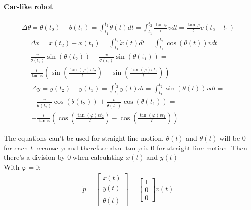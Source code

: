 \documentclass{article}
\begin{document}
	\paragraph{Car-like robot}
	\begin{gather}
	\Delta \theta = \theta(t_{2}) - \theta(t_{1}) = \int_{t_{1}}^{t_{2}} \dot{\theta}(t) dt = \int_{t_{1}}^{t_{2}} \frac{\tan \varphi}{l} v dt = \frac{\tan \varphi}{l} v (t_{2} - t_{1})
	\end{gather}
	\begin{gather}
	\nonumber \Delta x = x(t_{2}) - x(t_{1}) = \int_{t_{1}}^{t_{2}} \dot{x}(t) dt = \int_{t_{1}}^{t_{2}} \cos(\theta(t)) v dt =\\
	\nonumber \frac{v}{\dot{\theta}(t_{2})} \sin(\theta(t_{2})) - \frac{v}{\dot{\theta}(t_{1})} \sin(\theta(t_{1})) =\\
	\frac{l}{\tan \varphi}(\sin(\frac{\tan(\varphi)vt_{2}}{l}) - \sin(\frac{\tan(\varphi)vt_{1}}{l}))
	\end{gather}
	\begin{gather}
	\nonumber \Delta y = y(t_{2}) - y(t_{1}) = \int_{t_{1}}^{t_{2}} \dot{y}(t) dt = \int_{t_{1}}^{t_{2}} \sin(\theta(t)) v dt =\\
	\nonumber -\frac{v}{\dot{\theta}(t_{2})} \cos(\theta(t_{2})) + \frac{v}{\dot{\theta}(t_{1})} \cos(\theta(t_{1})) =\\
	-\frac{l}{\tan \varphi}(\cos(\frac{\tan(\varphi)vt_{2}}{l}) - \cos(\frac{\tan(\varphi)vt_{1}}{l}))
	\end{gather}
	
	The equations can't be used for straight line motion. $\theta(t)$ and $\dot{\theta}(t)$ will be 0 for each $t$ because $\varphi$ and therefore also $\tan \varphi$ is 0 for straight line motion. Then there's a division by 0 when calculating $x(t)$ and $y(t)$.\\
	
	With $\varphi = 0$:
	\begin{gather}
	\dot{p} = 
	\begin{bmatrix}
	\dot{x}(t)\\
	\dot{y}(t)\\
	\dot{\theta}(t)
	\end{bmatrix} = 
	\begin{bmatrix}
	1\\
	0\\
	0
	\end{bmatrix} v(t)
	\end{gather}
	
\end{document}
